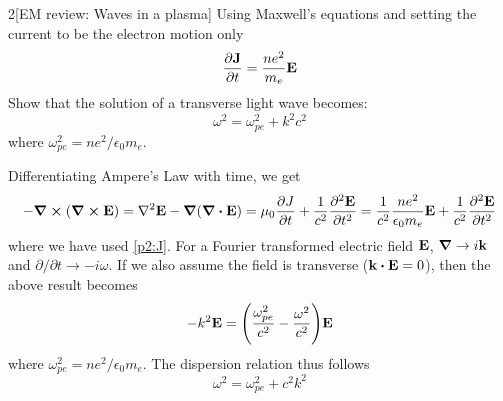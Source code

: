 \documentclass[12pt]{article}
\begin{document}
\begin{problem}{2}[EM review: Waves in a plasma]
Using Maxwell's equations and setting the current to be the electron motion 
only 
\begin{equation}\label{p2:J}
    \frac{\partial\vb{J}}{\partial t}=\frac{ne^2}{m_e}\vb{E}
\end{equation}
Show that the solution of a transverse light wave becomes:
\begin{equation}
    \omega^2=\omega_{pe}^2+k^2c^2 
\end{equation}
where $\omega_{pe}^2=ne^2/\epsilon_0m_e$.
\begin{solution}
    Differentiating Ampere's Law with time, we get
    \begin{equation}
        -\curl{\qty(\curl{\vb{E}})}=\laplacian{\vb{E}}-\grad\qty(\div{\vb{E}})=\mu_0\frac{\partial
        J}{\partial t}+\frac1{c^2}\frac{\partial^2\vb{E}}{\partial t^2} 
        =\frac1{c^2}\frac{ne^2}{\epsilon_0m_e}\vb{E}+\frac1{c^2}\frac{\partial^2\vb{E}}{\partial
        t^2}
    \end{equation}
    where we have used \eqref{p2:J}. For a Fourier transformed electric field
    $\vb{E}$, $\grad\to i\vb{k}$ and $\partial/\partial t\to-i\omega$. If we 
    also assume the field is transverse ($\vb{k}\vdot\vb{E}=0$), then the above
    result becomes
    \begin{equation}
        -k^2\vb{E}=\qty(\frac{\omega_{pe}^2}{c^2}-\frac{\omega^2}{c^2})\vb{E}
    \end{equation}
    where $\omega_{pe}^2=ne^2/\epsilon_0m_e$. The dispersion relation thus 
    follows
    \begin{equation}
        \omega^2=\omega_{pe}^2+c^2k^2 
    \end{equation}
\end{solution}
\end{problem}
\end{document}
